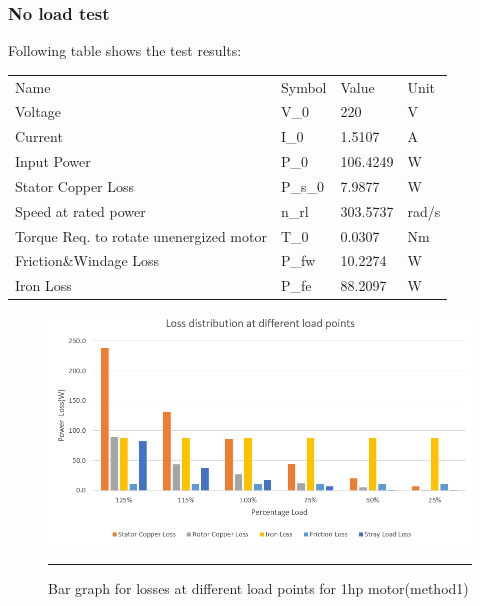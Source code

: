 \subsubsection{No load test}
Following table shows the test results:
\begin{table}[hbtp!]
\begin{tabular}{llll}
    \rowcolor[HTML]{656565} 
    Name                                                              & Symbol  & Value    & Unit  \\
    \cellcolor[HTML]{656565}Voltage                                   & V\_0    & 220      & V     \\
    \rowcolor[HTML]{F2F2F2} 
    \cellcolor[HTML]{656565}Current                                   & I\_0    & 1.5107   & A     \\
    \cellcolor[HTML]{656565}Input   Power                             & P\_0    & 106.4249 & W     \\
    \rowcolor[HTML]{F2F2F2} 
    \cellcolor[HTML]{656565}Stator   Copper Loss                      & P\_s\_0 & 7.9877   & W     \\
    \cellcolor[HTML]{656565}Speed at   rated power                    & n\_rl   & 303.5737 & rad/s \\
    \rowcolor[HTML]{F2F2F2} 
    \cellcolor[HTML]{656565}Torque   Req. to rotate unenergized motor & T\_0    & 0.0307   & Nm    \\
    \cellcolor[HTML]{656565}Friction\&Windage   Loss                  & P\_fw   & 10.2274  & W     \\
    \rowcolor[HTML]{F2F2F2} 
    \cellcolor[HTML]{656565}Iron Loss                                 & P\_fe   & 88.2097  & W    
\end{tabular}
\end{table}

\begin{figure}[hbtp!]
	\centering
		\includegraphics[width = 4.5in]{./Figures/MS/fig54.png}
		\rule{35em}{0.5pt}
	\caption{Bar graph for losses at different load points for 1hp motor(method1)}
	\label{fig:Bar graph for losses at different load points for 1hp motor(method1)} 
\end{figure}

